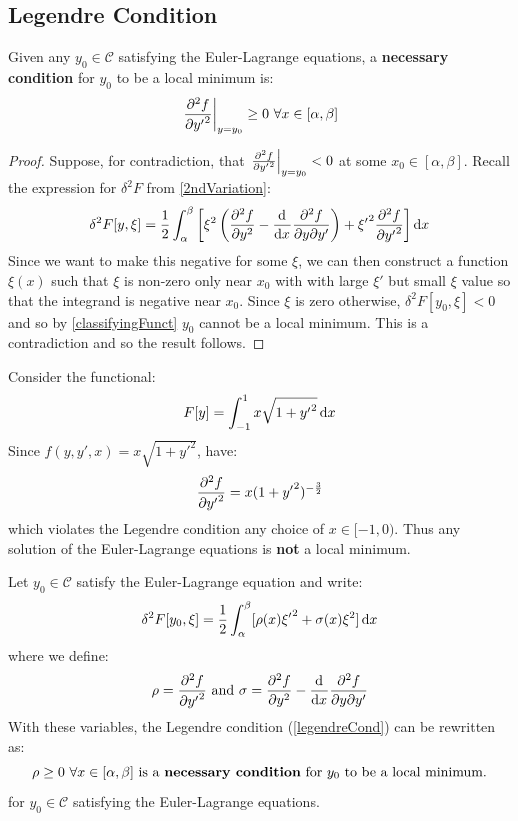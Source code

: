 \documentclass[../main.tex]{subfiles}
\begin{document}
\subsection{Legendre Condition}
\begin{proposition}
  Given any $y_0 \in \mathscr{C}$ satisfying the Euler-Lagrange equations, a \textbf{necessary condition} for $y_0$ to be a local minimum is: \label{legendreCond}
\[
    \at{\pderiv[2]{f}{{y'}}}{y = y_0} \geq 0\ \forall x \in [\alpha, \beta]
  \]
\end{proposition}
\begin{proof}
  Suppose, for contradiction, that $\at{\pderiv[2]{f}{{y'}}}{y = y_0} < 0$ at some $x_0 \in [\alpha, \beta]$.
  Recall the expression for $\delta^2 F$ from \cref{2ndVariation}:
  \[
    \delta^2 F[y, \xi] = \frac{1}{2}\int_{\alpha}^{\beta} \left[\xi^2 \left(\pderiv[2]{f}{y} - \deriv{}{x} \frac{\partial^2 f}{\partial y \partial y'}\right) + {\xi'}^2 \pderiv[2]{f}{{y'}}\right] \d{x}
  \]
  Since we want to make this negative for some $\xi$, we can then construct a function $\xi(x)$ such that $\xi$ is non-zero only near $x_0$ with with large $\xi'$ but small $\xi$ value so that the integrand is negative near $x_0$.
  Since $\xi$ is zero otherwise, $\delta^2 F[y_0, \xi] < 0$ and so by \cref{classifyingFunct} $y_0$ cannot be a local minimum.
  This is a contradiction and so the result follows.
\end{proof}
\begin{example}
  Consider the functional:
  \[
    F[y] = \int_{-1}^{1} x\sqrt{1 + {y'}^2} \d{x}
  \]
  Since $f(y, y', x) = x \sqrt{1 + {y'}^2}$, have:
  \[
    \pderiv[2]{f}{{y'}} = x(1 + {y'}^2)^{-\frac{3}{2}}
  \]
  which violates the Legendre condition any choice of $x \in [-1, 0)$.
  Thus any solution of the Euler-Lagrange equations is \textbf{not} a local minimum.
\end{example}
Let $y_0 \in \mathscr{C}$ satisfy the Euler-Lagrange equation and write:
\begin{equation}
  \delta^2 F[y_0, \xi] = \frac{1}{2} \int_{\alpha}^{\beta} [\rho(x) {\xi'}^2 + \sigma(x)\xi^2] \d{x} \label{2ndVar}
\end{equation}
where we define:
\[
  \rho = \pderiv[2]{f}{{y'}} \text{ and } \sigma = \pderiv[2]{f}{y} - \deriv{}{x} \frac{\partial^2 f}{\partial y \partial y'}
\]
With these variables, the Legendre condition (\cref{legendreCond}) can be rewritten as:
\[
  \rho \geq 0\ \forall x \in [\alpha, \beta] \text{ is a \textbf{necessary condition} for $y_0$ to be a local minimum.}
\]
for $y_0 \in \mathscr{C}$ satisfying the Euler-Lagrange equations.
\end{document}
